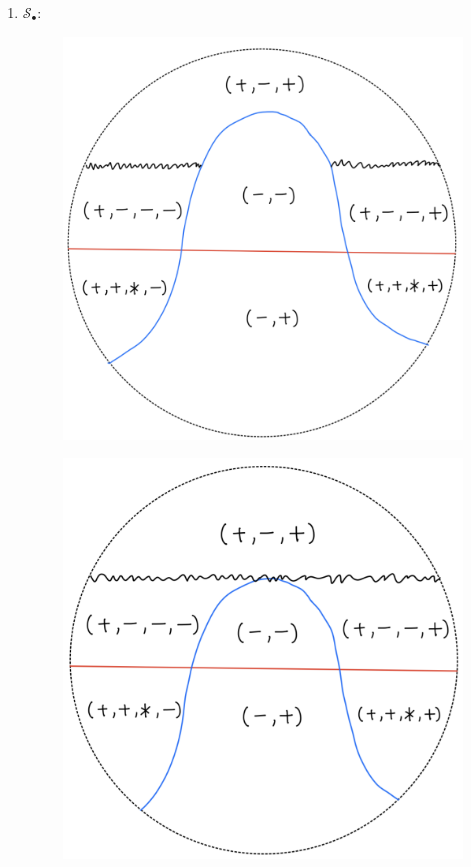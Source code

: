 \begin{definition}
\begin{enumerate}
\item $\mathcal{S}_\bullet$:
\begin{itemize}
\begin{figure}[H]
    \centering
    \includegraphics[scale = 0.45]{diagrams/lemma2/7.png} 
    \caption{}
    \label{fig:your-label}
\end{figure}
\begin{figure}[H]
    \centering
    \includegraphics[scale = 0.45]{diagrams/lemma2/8.png} 

\end{figure}
\end{itemize}
\end{enumerate}
\end{definition}
